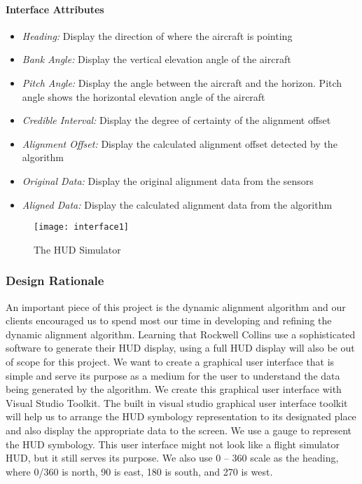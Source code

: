 			\paragraph{Interface Attributes}
			\begin{itemize}
				\item \textit{Heading:} Display the direction of where the aircraft is pointing  
				\item \textit{Bank Angle:} Display the vertical elevation angle of the aircraft
				\item \textit{Pitch Angle:}  Display the angle between the aircraft and the horizon. Pitch angle shows the horizontal elevation angle of the aircraft 
				\item \textit{Credible Interval:} Display the degree of certainty of the alignment offset 
				\item \textit{Alignment Offset:} Display the calculated alignment offset detected by the algorithm 
				\item \textit{Original Data:} Display the original alignment data from the sensors 
				\item \textit{Aligned Data:} Display the calculated alignment data from the algorithm 
			\end{itemize}

			\begin{figure}[h]
				\centering
			 		\caption{The HUD Simulator}			%
			      	\texttt{[image: interface1]}
			    \label{fig:interface1}
			\end{figure}

		\subsubsection{Design Rationale}
		An important piece of this project is the dynamic alignment algorithm and our clients encouraged us to spend most our time in developing and refining the dynamic alignment algorithm. Learning that Rockwell Collins use a sophisticated software to generate their HUD display, using a full HUD display will also be out of scope for this project. We want to create a graphical user interface that is simple and serve its purpose as a medium for the user to understand the data being generated by the algorithm. We create this graphical user interface with Visual Studio Toolkit. The built in visual studio graphical user interface toolkit will help us to arrange the HUD symbology representation to its designated place and also display the appropriate data to the screen. We use a gauge to represent the HUD symbology. This user interface might not look like a flight simulator HUD, but it still serves its purpose. We also use 0 – 360 scale as the heading, where 0/360 is north, 90 is east, 180 is south, and 270 is west. 
		
